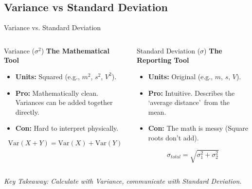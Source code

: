 \subsection{Variance vs Standard Deviation}
\begin{frame}{Variance vs. Standard Deviation}
    \begin{columns}
        \begin{block}{Variance ($\sigma^2$)}
            \textbf{The Mathematical Tool}
            \begin{itemize}
                \item \textbf{Units:} Squared (e.g., $m^2$, $s^2$, $V^2$).
                \item \textbf{Pro:} Mathematically clean. Variances can be added together directly.
                \item \textbf{Con:} Hard to interpret physically.
            \end{itemize}
            \[ \text{Var}(X+Y) = \text{Var}(X) + \text{Var}(Y) \]
        \end{block}

        \begin{block}{Standard Deviation ($\sigma$)}
            \textbf{The Reporting Tool}
            \begin{itemize}
                \item \textbf{Units:} Original (e.g., $m$, $s$, $V$).
                \item \textbf{Pro:} Intuitive. Describes the \lq average distance\rq\ from the mean.
                \item \textbf{Con:} The math is messy (Square roots don't add).
            \end{itemize}
            \[ \sigma_{total} = \sqrt{\sigma_1^2 + \sigma_2^2} \]
        \end{block}
    \end{columns}

    \vspace{0.5cm}
    \centering
    \textit{Key Takeaway: Calculate with Variance, communicate with Standard Deviation.}
\end{frame}

